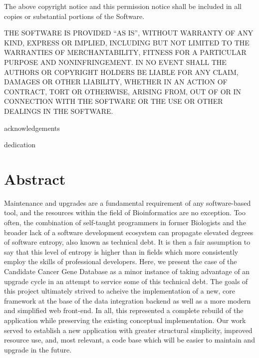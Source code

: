 \documentclass[10pt]{report}
\begin{document}
The above copyright notice and this permission notice shall be included in all copies or substantial portions of the Software.

THE SOFTWARE IS PROVIDED ``AS IS'', WITHOUT WARRANTY OF ANY KIND, EXPRESS OR IMPLIED, INCLUDING BUT NOT LIMITED TO THE WARRANTIES OF MERCHANTABILITY, FITNESS FOR A PARTICULAR PURPOSE AND NONINFRINGEMENT\@. IN NO EVENT SHALL THE AUTHORS OR COPYRIGHT HOLDERS BE LIABLE FOR ANY CLAIM, DAMAGES OR OTHER LIABILITY, WHETHER IN AN ACTION OF CONTRACT, TORT OR OTHERWISE, ARISING FROM, OUT OF OR IN CONNECTION WITH THE SOFTWARE OR THE USE OR OTHER DEALINGS IN THE SOFTWARE\@.

\newpage
{}

acknowledgements

\newpage

dedication

\newpage

\section{Abstract}
Maintenance and upgrades are a fundamental requirement of any software-based tool, and the resources within the field of Bioinformatics are no exception. Too often, the combination of self-taught programmers in former Biologists and the broader lack of a software development ecosystem can propagate elevated degrees of software entropy, also known as technical debt. It is then a fair assumption to say that this level of entropy is higher than in fields which more consistently employ the skills of professional developers. Here, we present the case of the Candidate Cancer Gene Database as a minor instance of taking advantage of an upgrade cycle in an attempt to service some of this technical debt. The goals of this project ultimately strived to acheive the implementation of a new, core framework at the base of the data integration backend as well as a more modern and simplified web front-end. In all, this represented a complete rebuild of the application while preserving the existing conceptual implementation. Our work served to establish a new application with greater structural simplicity, improved resource use, and, most relevant, a code base which will be easier to maintain and upgrade in the future.

\tableofcontents
{}
\listoftables
{}
\listoffigures
\end{document}
